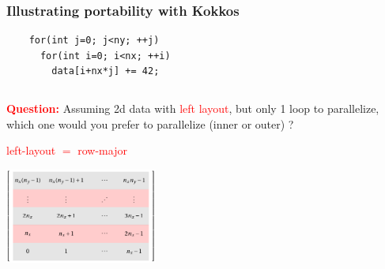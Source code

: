 \begin{frame}[fragile=singleslide]
  \frametitle{Illustrating portability with Kokkos}


  \begin{center}
    \begin{minipage}{0.5\textwidth}
      \begin{verbatim}
    for(int j=0; j<ny; ++j)
      for(int i=0; i<nx; ++i)
        data[i+nx*j] += 42;
      \end{verbatim}
    \end{minipage}
  \end{center}

  \begin{columns}
    \begin{column}{0.45\textwidth}
      \begin{block}{}
        { \small
          \textcolor{red}{\bf Question:}
          Assuming 2d data with \textcolor{red}{left layout}, but only 1 loop to parallelize, which one would you prefer to parallelize (inner or outer) ?}
      \end{block}

      \begin{center}
        \textcolor{red}{left-layout $=$ row-major}

        \includegraphics[width=5cm]{tikz/row-major}


\end{center}
\end{column}
\end{columns}
\end{frame}
